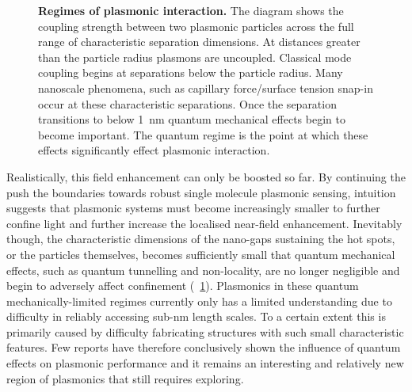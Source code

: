 \documentclass[12pt, a4paper, twoside]{book}
\begin{document}
\begin{figure}[bt]
\centering
{}
\caption[Regimes of plasmonic interaction.]{\textbf{Regimes of plasmonic interaction.} The diagram shows the coupling strength between two plasmonic particles across the full range of characteristic separation dimensions. At distances greater than the particle radius plasmons are uncoupled. Classical mode coupling begins at separations below the particle radius. Many nanoscale phenomena, such as capillary force/surface tension snap-in occur at these characteristic separations. Once the separation transitions to below \SI{1}{nm} quantum mechanical effects begin to become important. The quantum regime is the point at which these effects significantly effect plasmonic interaction.}
\label{fig:plasmonic_regimes}
\vspace{-10pt}
\end{figure}

Realistically, this field enhancement can only be boosted so far. By continuing the push the boundaries towards robust single molecule plasmonic sensing, intuition suggests that plasmonic systems must become increasingly smaller to further confine light and further increase the localised near-field enhancement. Inevitably though, the characteristic dimensions of the nano-gaps sustaining the hot spots, or the particles themselves, becomes sufficiently small that quantum mechanical effects, such as quantum tunnelling and non-locality, are no longer negligible and begin to adversely affect confinement (\figurename~\ref{fig:plasmonic_regimes}). Plasmonics in these quantum mechanically-limited regimes currently only has a limited understanding due to difficulty in reliably accessing sub-nm length scales. To a certain extent this is primarily caused by difficulty fabricating structures with such small characteristic features. Few reports have therefore conclusively shown the influence of quantum effects on plasmonic performance and it remains an interesting and relatively new region of plasmonics that still requires exploring.
\end{document}
